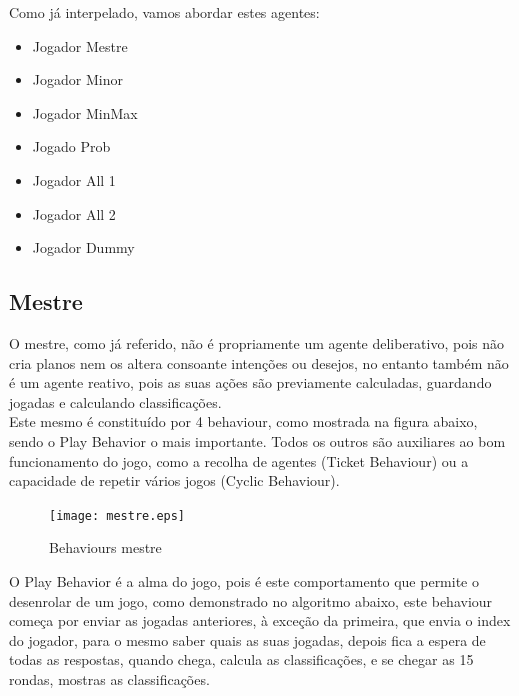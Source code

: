 \documentclass[12pt]{article}
\begin{document}
    Como já interpelado, vamos abordar estes agentes:\\

    \begin{itemize}
        \item Jogador Mestre
        \item Jogador Minor
        \item Jogador MinMax
        \item Jogado Prob
        \item Jogador All 1
        \item Jogador All 2
        \item Jogador Dummy
    \end{itemize}
	
	
	\subsection*{Mestre}
	O mestre, como já referido, não é propriamente um agente deliberativo, pois não cria planos nem os altera consoante intenções ou desejos, no entanto também não é um agente reativo, pois as suas ações são previamente calculadas, guardando jogadas e calculando classificações.\\
    Este mesmo é constituído por 4 behaviour, como mostrada na figura abaixo, sendo o Play Behavior o mais importante. Todos os outros são auxiliares ao bom funcionamento do jogo, como a recolha de agentes (Ticket Behaviour) ou a capacidade de repetir vários jogos (Cyclic Behaviour).\\
    
    \begin{figure}[h]
		\centering
        \texttt{[image: mestre.eps]}
		\caption{Behaviours mestre}
		\label{fig:mestre}
	\end{figure}
	
	O Play Behavior é a alma do jogo, pois é este comportamento que permite o desenrolar de um jogo, como demonstrado no algoritmo abaixo, este behaviour começa por enviar as jogadas 
    anteriores, à exceção da primeira, que envia o index do jogador, para o mesmo saber quais as suas jogadas, depois fica a espera de todas as respostas, quando chega, calcula as classificações, e se chegar as 15 rondas, mostras as classificações.\\
\end{document}
